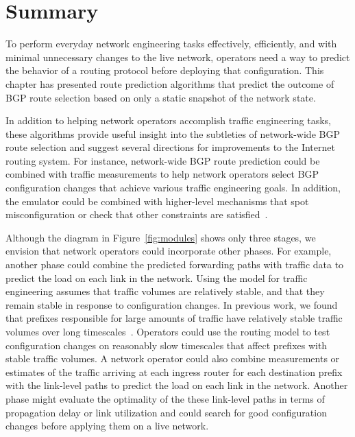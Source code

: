 
\section{Summary}
\label{sec:sandbox_concl}

To perform everyday network engineering tasks effectively, efficiently,
and with minimal unnecessary changes to the live network, 
operators need a way to predict the behavior of a routing protocol
before deploying that configuration.  
This chapter has presented route prediction algorithms that predict the
outcome of BGP route selection based on only a static snapshot of the
network state.

In addition to helping network operators accomplish traffic engineering
tasks, these algorithms provide useful insight into the subtleties of
network-wide BGP route selection and suggest several directions for
improvements to the Internet routing system.  For instance,
network-wide BGP route prediction could be combined with traffic
measurements to help network operators select BGP configuration changes
that achieve various traffic engineering goals.  In addition, the
emulator could be combined with higher-level mechanisms that spot
misconfiguration or check that other constraints
are satisfied~\cite{Feamster2004h}.

Although the diagram in Figure~\ref{fig:modules} shows only three
stages, we envision that network operators could incorporate other
phases.  For example, another phase could
combine the predicted forwarding paths with traffic data to predict
the load on each link in the network.  Using the model for traffic
engineering assumes that traffic volumes are relatively stable, and
that they remain stable in response to configuration changes.  In
previous work, we found that prefixes responsible for large amounts of
traffic have relatively stable traffic volumes over long
timescales~\cite{Feamster2003e}.  Operators could use the routing model to
test configuration changes on reasonably slow timescales that affect
prefixes with stable traffic volumes.  A network operator could also
combine measurements or estimates of the traffic arriving at each
ingress router for each destination prefix~\cite{Feldmann2001b} with the
link-level paths to predict the load on each link in the network.
Another phase might evaluate the optimality of the these link-level
paths in terms of propagation delay or link utilization and could
search for good configuration changes before applying them on a live
network.

